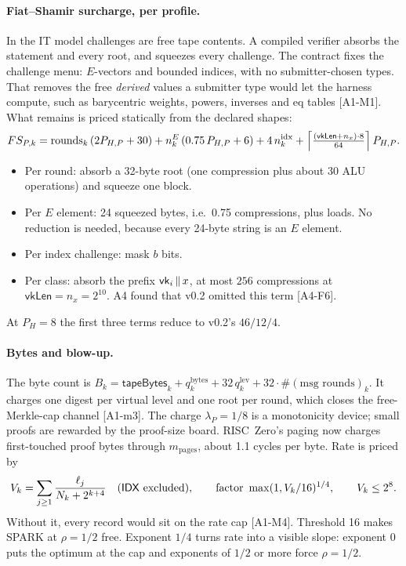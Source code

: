 \paragraph{Fiat--Shamir surcharge, per profile.} In the IT model challenges are free tape contents. A
compiled verifier absorbs the statement and every root, and squeezes every challenge. The contract
fixes the challenge menu: $E$-vectors and bounded indices, with no submitter-chosen types. That removes
the free \emph{derived} values a submitter type would let the harness compute, such as barycentric
weights, powers, inverses and $\mathrm{eq}$ tables [A1-M1]. What remains is priced statically from the
declared shapes:
\[
  FS_{P,k}=\mathrm{rounds}_k\,(2P_{H,P}+30)+n^{E}_k\,(0.75\,P_{H,P}+6)+4\,n^{\mathrm{idx}}_k
  +\Bigl\lceil\tfrac{(\mathsf{vkLen}+n_x)\cdot8}{64}\Bigr\rceil\,P_{H,P}.
\]
\begin{itemize}[nosep]
\item Per round: absorb a 32-byte root (one compression plus about 30 ALU operations) and squeeze one
  block.
\item Per $E$ element: 24 squeezed bytes, i.e.\ 0.75 compressions, plus loads. No reduction is needed,
  because every 24-byte string is an $E$ element.
\item Per index challenge: mask $b$ bits.
\item Per class: absorb the prefix $\mathsf{vk}_i\,\|\,x$, at most $256$ compressions at
  $\mathsf{vkLen}=n_x=2^{10}$. A4 found that v0.2 omitted this term [A4-F6].
\end{itemize}
At $P_H=8$ the first three terms reduce to v0.2's $46/12/4$.

\paragraph{Bytes and blow-up.} The byte count is
$B_k=\mathsf{tapeBytes}_k+q^{\mathrm{bytes}}_k+32\,q^{\mathrm{lev}}_k+32\cdot\#(\text{msg rounds})_k$.
It charges one digest per virtual level and one root per round, which closes the free-Merkle-cap
channel [A1-m3]. The charge $\lambda_P=1/8$ is a monotonicity device; small proofs are rewarded by the
proof-size board. RISC~Zero's paging now charges first-touched proof bytes through $m_{\mathrm{pages}}$,
about 1.1 cycles per byte. Rate is priced by
\[
  V_k=\sum_{j\ge1}\frac{\ell_j}{N_k+2^{k+4}}\quad(\mathsf{IDX}\text{ excluded}),\qquad
  \text{factor }\max(1,V_k/16)^{1/4},\qquad V_k\le2^8 .
\]
Without it, every record would sit on the rate cap [A1-M4]. Threshold 16 makes SPARK at $\rho=1/2$
free. Exponent $1/4$ turns rate into a visible slope: exponent 0 puts the optimum at the cap and
exponents of $1/2$ or more force $\rho=1/2$.

